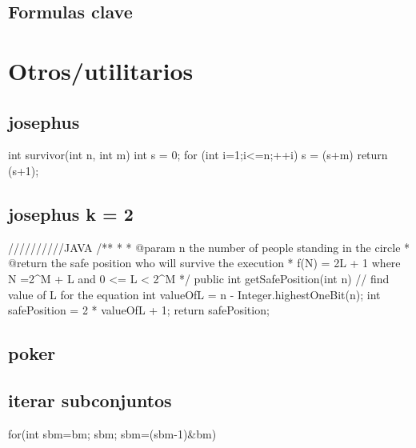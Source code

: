 \subsection{Formulas clave}


\section{Otros/utilitarios}
\subsection{josephus}
\begin{code}
int survivor(int n, int m){
   int s = 0;
   for (int i=1;i<=n;++i) s = (s+m)%
   return (s+1);
}
\end{code}
\subsection{josephus k = 2}
\begin{code}
//////////JAVA
    /**
	 * 
	 * @param n the number of people standing in the circle
	 * @return the safe position who will survive the execution 
	 *   f(N) = 2L + 1 where N =2^M + L and 0 <= L < 2^M
	 */
	public int getSafePosition(int n) {
		// find value of L for the equation
		int valueOfL = n - Integer.highestOneBit(n);
		int safePosition = 2 * valueOfL  + 1;	
		return safePosition;
	}
\end{code}
\subsection{poker}
\subsection{iterar subconjuntos}
\begin{code}
for(int sbm=bm; sbm; sbm=(sbm-1)&bm)
\end{code}

